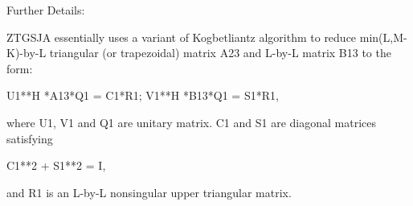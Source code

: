\begin{DoxyParagraph}{Further Details\+: }
\begin{DoxyVerb}  ZTGSJA essentially uses a variant of Kogbetliantz algorithm to reduce
  min(L,M-K)-by-L triangular (or trapezoidal) matrix A23 and L-by-L
  matrix B13 to the form:

           U1**H *A13*Q1 = C1*R1; V1**H *B13*Q1 = S1*R1,

  where U1, V1 and Q1 are unitary matrix.
  C1 and S1 are diagonal matrices satisfying

                C1**2 + S1**2 = I,

  and R1 is an L-by-L nonsingular upper triangular matrix.\end{DoxyVerb}
 
\end{DoxyParagraph}
